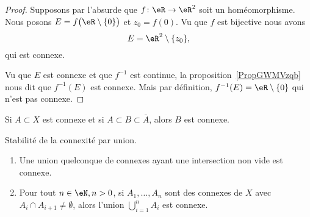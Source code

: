 \begin{proof}
    Supposons par l'absurde que \( f\colon \eR\to \eR^2\) soit un  homéomorphisme. Nous posons \( E=f\big( \eR\setminus\{ 0 \} \big)\) et \( z_0=f(0)\). Vu que \( f\) est bijective nous avons
    \begin{equation}
        E=\eR^2\setminus\{ z_0 \},
    \end{equation}
    qui est connexe.

    Vu que \( E\) est connexe et que \( f^{-1}\) est continue, la proposition~\ref{PropGWMVzqb} nous dit que \( f^{-1}(E)\) est connexe. Mais par définition, \( f^{-1}(E)=\eR\setminus\{ 0 \}\) qui n'est pas connexe.
\end{proof}


\begin{proposition}
    Si \( A\subset X\) est connexe et si \( A\subset B\subset \bar A\), alors \( B\) est connexe.
\end{proposition}

\begin{proposition} \label{PropIWIDzzH}
    Stabilité de la connexité par union.
    \begin{enumerate}
        \item
    Une union quelconque de connexes ayant une intersection non vide est connexe.
\item
    Pour tout \( n \in \eN, n > 0 \), si \( A_1,\ldots, A_n\) sont des connexes de \( X\) avec \( A_i\cap A_{i+1}\neq \emptyset\), alors l'union \( \bigcup_{i=1}^nA_i\) est connexe.
    \end{enumerate}
\end{proposition}

